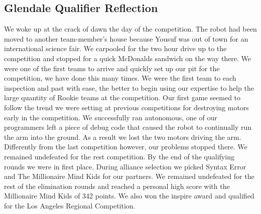 \newpage \subsection{Glendale Qualifier Reflection}
We woke up at the crack of dawn the day of the competition. The robot had been moved to another team-member’s house because Yousuf was out of town for an international science fair. We carpooled for the two hour drive up to the competition and stopped for a quick McDonalds sandwich on the way there. We were one of the first teams to arrive and quickly set up our pit for the competition, we have done this many times. We were the first team to each inspection and past with ease, the better to begin using our expertise to help the large quantity of Rookie teams at the competition. Our first game seemed to follow the trend we were setting at previous competitions for destroying motors early in the competition. We successfully ran autonomous, one of our programmers left a piece of debug code that caused the robot to continually run the arm into the ground. As a result we lost the two motors driving the arm. Differently from the last competition however, our problems stopped there. We remained undefeated for the rest competition. By the end of the qualifying rounds we were in first place. During alliance selection we picked Syntax Error and The Millionaire Mind Kids for our partners. We remained undefeated for the rest of the elimination rounds and reached a personal high score with the Millionaire Mind Kids of 342 points. We also won the inspire award and qualified for the Los Angeles Regional Competition.